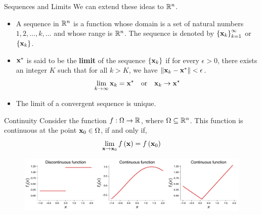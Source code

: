 \documentclass[aspectratio=169]{beamer}
\let\olditem\item
\renewcommand{\item}{\setlength{\itemsep}{\fill}\olditem}
\def\mf{\ensuremath\mathbf}
\def\mb{\ensuremath\mathbb}
\def\lp{\ensuremath\left(}
\def\rp{\ensuremath\right)}
\def\lV{\ensuremath\left\lVert}
\def\rV{\ensuremath\right\rVert}
\def\lc{\ensuremath\left\{}
\def\rc{\ensuremath\right\}}
\def\R{\ensuremath\mb{R}}
\newcommand{\ct}[1]{\lp #1\rp}
\begin{document}
\begin{frame}[t]{Sequences and Limits}
  We can extend these ideas to $\R^n$.
  \begin{itemize}
    \item A sequence in $\R^n$ is a function whose domain is a set of natural numbers $1, 2, \ldots, k, \ldots$ and whose range is $\R^n$. The sequence is denoted by $\lc \mf{x}_k\rc_{k=1}^{\infty}$ or $\lc \mf{x}_k \rc$.
    \vspace{0.25cm}
  
    \item $\mf{x}^{*}$ is said to be the \textbf{limit} of the sequence $\lc \mf{x}_k \rc$ if for every $\epsilon > 0$, there exists an integer $K$ such that for all $k > K$, we have $\lV \mf{x}_k - \mf{x}^{*} \rV < \epsilon$.
    \[ \lim_{k \to \infty} \mf{x}_k = \mf{x}^{\star} \quad \mathrm{or} \quad \mf{x}_k \to \mf{x}^{\star} \]

    \item The limit of a convergent sequence is unique.
  \end{itemize}
\end{frame}


\begin{frame}[t]{Continuity}
  Consider the function $f: \Omega \to \R$, where $\Omega \subseteq \R^n$. This function is continuous at the point $\mf{x}_0 \in \Omega$, if and only if, 
  \[ \lim_{\mf{x} \to \mf{x}_0} f\ct{\mf{x}} = f\ct{\mf{x}_0} \]
  
  \begin{figure}
    \centering
    \includegraphics[width=\textwidth]{figs/func_cont.pdf}
  \end{figure}
\end{frame}
\end{document}
